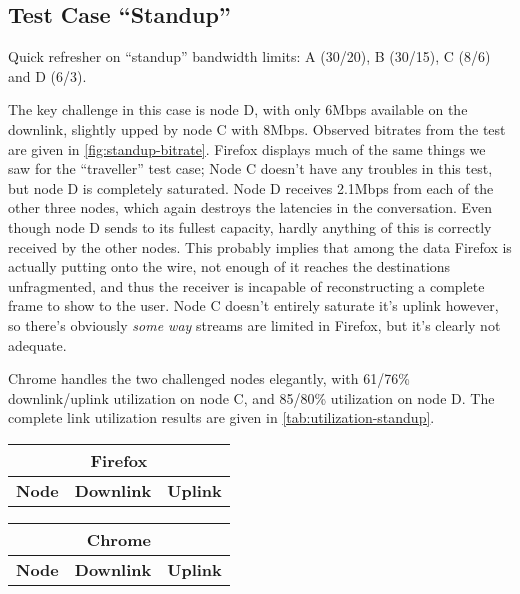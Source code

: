 \subsection{Test Case ``Standup''}

Quick refresher on ``standup'' bandwidth limits: A (30/20), B (30/15), C (8/6) and D (6/3).

The key challenge in this case is node D, with only 6Mbps available on the downlink, slightly upped by node C with 8Mbps. Observed bitrates from the test are given in \autoref{fig:standup-bitrate}. Firefox displays much of the same things we saw for the ``traveller'' test case; Node C doesn't have any troubles in this test, but node D is completely saturated. Node D receives 2.1Mbps from each of the other three nodes, which again destroys the latencies in the conversation. Even though node D sends to its fullest capacity, hardly anything of this is correctly received by the other nodes. This probably implies that among the data Firefox is actually putting onto the wire, not enough of it reaches the destinations unfragmented, and thus the receiver is incapable of reconstructing a complete frame to show to the user. Node C doesn't entirely saturate it's uplink however, so there's obviously \emph{some way} streams are limited in Firefox, but it's clearly not adequate.

Chrome handles the two challenged nodes elegantly, with 61/76\% downlink/uplink utilization on node C, and 85/80\% utilization on node D. The complete link utilization results are given in \autoref{tab:utilization-standup}.

\begin{center}
    \label{tab:utilization-standup}
    \begin{tabular}{| l | l | l |}
    \multicolumn{3}{c}{\textbf{Firefox}} \\ \hline
    \textbf{Node} & \textbf{Downlink} & \textbf{Uplink} \\ \hline
    
    \hline
    \end{tabular}
    \begin{tabular}{| l | l | l |}
    \multicolumn{3}{c}{\textbf{Chrome}} \\ \hline
    \textbf{Node} & \textbf{Downlink} & \textbf{Uplink} \\ \hline
    
    \hline
    \end{tabular}
\end{center}

